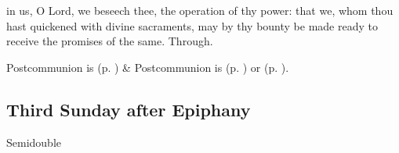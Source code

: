 \vspace{-0.25\baselineskip}

\postcommunion\label{EpiphanyIIPostcommunion}
 in us, O Lord, we beseech thee, the operation of thy power: that we, whom thou hast quickened with divine sacraments, may by thy bounty be made ready to receive the promises of the same. Through.
\begin{rubric}
     Postcommunion is  (p. \pageref{SPMaryPostChristmas}) \&  Postcommunion is  (p. \pageref{SPAgainst}) or  (p. \pageref{SPChiefBishop}).
\end{rubric}


\subsection{Third Sunday after Epiphany}\label{epiphany}
\begin{inhead}
{Semidouble}
\end{inhead}


